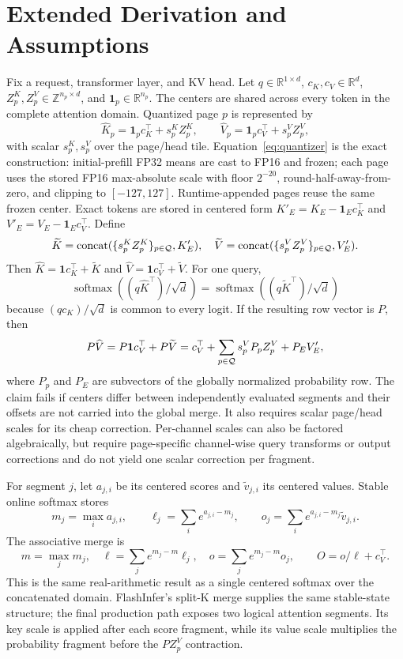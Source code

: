 \section{Extended Derivation and Assumptions}

Fix a request, transformer layer, and KV head. Let
$q\in\mathbb R^{1\times d}$, $c_K,c_V\in\mathbb R^d$,
$Z_p^K,Z_p^V\in\mathbb Z^{n_p\times d}$, and
$\mathbf1_p\in\mathbb R^{n_p}$. The centers are shared across every token in
the complete attention domain. Quantized page $p$ is represented by
\[
\widehat K_p=\mathbf1_pc_K^\top+s_p^KZ_p^K,\qquad
\widehat V_p=\mathbf1_pc_V^\top+s_p^VZ_p^V,
\]
with scalar $s_p^K,s_p^V$ over the page/head tile. Equation~\eqref{eq:quantizer}
is the exact construction: initial-prefill FP32 means are cast to FP16 and
frozen; each page uses the stored FP16 max-absolute scale with floor $2^{-20}$,
round-half-away-from-zero, and clipping to $[-127,127]$. Runtime-appended pages
reuse the same frozen center. Exact tokens are stored in centered form
$K'_E=K_E-\mathbf1_Ec_K^\top$ and $V'_E=V_E-\mathbf1_Ec_V^\top$. Define
\[
\widetilde K=\operatorname{concat}(\{s_p^KZ_p^K\}_{p\in\mathcal{Q}},K'_E),\quad
\widetilde V=\operatorname{concat}(\{s_p^VZ_p^V\}_{p\in\mathcal{Q}},V'_E).
\]
Then $\widehat K=\mathbf 1c_K^\top+\widetilde K$ and
$\widehat V=\mathbf 1c_V^\top+\widetilde V$. For one query,
\[
\operatorname{softmax}\!\left((q\widehat K^\top)/\sqrt d\right)
=\operatorname{softmax}\!\left((q\widetilde K^\top)/\sqrt d\right)
\]
because $(qc_K)/\sqrt d$ is common to every logit. If the resulting row vector
is $P$, then
\[
P\widehat V=P\mathbf1c_V^\top+P\widetilde V
=c_V^\top+\sum_{p\in\mathcal{Q}}s_p^VP_pZ_p^V+P_EV'_E,
\]
where $P_p$ and $P_E$ are subvectors of the globally normalized probability
row. The claim fails if centers differ between independently evaluated segments and
their offsets are not carried into the global merge. It also requires scalar
page/head scales for its cheap correction. Per-channel scales can also be
factored algebraically, but require page-specific channel-wise query transforms
or output corrections and do not yield one scalar correction per fragment.

For segment $j$, let $a_{j,i}$ be its centered scores and
$\widetilde v_{j,i}$ its centered values. Stable online softmax stores
\[
m_j=\max_i a_{j,i},\qquad
\ell_j=\sum_i e^{a_{j,i}-m_j},\qquad
o_j=\sum_i e^{a_{j,i}-m_j}\widetilde v_{j,i}.
\]
The associative merge is
\[
m=\max_jm_j,\quad
\ell=\sum_je^{m_j-m}\ell_j,\quad
o=\sum_je^{m_j-m}o_j,\qquad O=o/\ell+c_V^\top.
\]
This is the same real-arithmetic result as a single centered softmax over the
concatenated domain. FlashInfer's split-K merge supplies the same stable-state
structure; the final production path exposes two logical attention segments.
Its key scale is applied after each score fragment, while its value scale
multiplies the probability fragment before the $PZ_p^V$ contraction.

